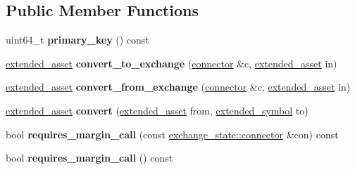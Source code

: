 \subsection*{Public Member Functions}
\begin{DoxyCompactItemize}
\item 
\mbox{\label{structaacio_1_1exchange__state_a841039a94a3f68ac7a233b258d6b3116}} 
uint64\+\_\+t {\bfseries primary\+\_\+key} () const
\item 
\mbox{\label{structaacio_1_1exchange__state_aad9c4477d2dc03615a103c751e303710}} 
\mbox{\hyperlink{structaacio_1_1extended__asset}{extended\+\_\+asset}} {\bfseries convert\+\_\+to\+\_\+exchange} (\mbox{\hyperlink{structaacio_1_1exchange__state_1_1connector}{connector}} \&c, \mbox{\hyperlink{structaacio_1_1extended__asset}{extended\+\_\+asset}} in)
\item 
\mbox{\label{structaacio_1_1exchange__state_a88701ca6d384e4b3ba3ee71d77a0cd1b}} 
\mbox{\hyperlink{structaacio_1_1extended__asset}{extended\+\_\+asset}} {\bfseries convert\+\_\+from\+\_\+exchange} (\mbox{\hyperlink{structaacio_1_1exchange__state_1_1connector}{connector}} \&c, \mbox{\hyperlink{structaacio_1_1extended__asset}{extended\+\_\+asset}} in)
\item 
\mbox{\label{structaacio_1_1exchange__state_a34d21c83cb533dc149e2ae278c80eafa}} 
\mbox{\hyperlink{structaacio_1_1extended__asset}{extended\+\_\+asset}} {\bfseries convert} (\mbox{\hyperlink{structaacio_1_1extended__asset}{extended\+\_\+asset}} from, \mbox{\hyperlink{structaacio_1_1extended__symbol}{extended\+\_\+symbol}} to)
\item 
\mbox{\label{structaacio_1_1exchange__state_a8b952d4e7a46d9e2ee5a345175768268}} 
bool {\bfseries requires\+\_\+margin\+\_\+call} (const \mbox{\hyperlink{structaacio_1_1exchange__state_1_1connector}{exchange\+\_\+state\+::connector}} \&con) const
\item 
\mbox{\label{structaacio_1_1exchange__state_a70853261055882362825df165cb36f4f}} 
bool {\bfseries requires\+\_\+margin\+\_\+call} () const
\end{DoxyCompactItemize}
